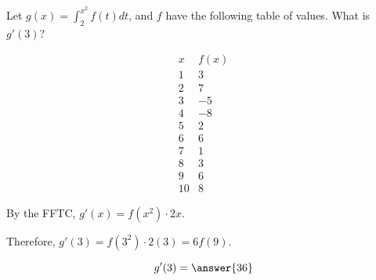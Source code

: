 \documentclass{ximera}
\author{Steven Gubkin}
\begin{document}
\begin{exercise}

Let $g(x) = \int_2^{x^2} f(t) dt$, and $f$ have the following table
of values.  What is $g'(3)$?

\[
\begin{array}{c|c}
 x & f(x) \\ \hline
1 & 3 \\
2 & 7 \\
3 & -5\\
4 & -8 \\
5 & 2 \\
6 & 6 \\
7 & 1 \\
8 & 3 \\
9 & 6 \\
10 & 8
\end{array}
\]
\begin{hint}
By the FFTC, $g'(x)=f(x^2)\cdot2x$.
\end{hint}
\begin{hint}
Therefore, $g'(3)=f(3^2)\cdot2(3)=6f(9)$.
\end{hint}
\begin{prompt}
  \[
  g'(3) = \answer{36}
  \]
\end{prompt}
\end{exercise}
\end{document}
